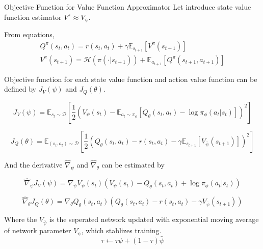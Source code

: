 \documentclass[8pt]{beamer}
\begin{document}
\begin{frame}{Objective Function for Value Function Approximator}
    Let introduce state value function estimator $V^\pi \approx V_\psi$.

    From equations,
    \[
    \begin{gathered}
        Q^\pi (s_t, a_t) = r(s_t, a_t) + \gamma \mathbb{E}_{s_{t+1}}[V^\pi (s_{t+1})] \\
        V^\pi(s_{t+1}) = \mathcal{H}(\pi(\cdot | s_{t+1})) + \mathbb{E}_{a_{t+1}}[Q^\pi(s_{t+1}, a_{t+1})]
    \end{gathered}
    \]

    Objective function for each state value function and action value function can be defined by $J_V (\psi)$ and $J_Q (\theta)$.

    \begin{equation*}
        J_V(\psi) = \mathbb{E}_{s_t \sim \mathcal{D}} \left[ \frac{1}{2} \left(V_\psi (s_t) - \mathbb{E}_{a_t \sim \pi_\phi}[Q_\theta(s_t, a_t) - \log{\pi_\phi (a_t | s_t)}]\right)^2 \right] 
    \end{equation*}

    \begin{equation*}
        J_Q(\theta) = \mathbb{E}_{(s_t,a_t) \sim \mathcal{D}} \left[ \frac{1}{2} \left(Q_\theta (s_t, a_t) - r(s_t,a_t) - \gamma \mathbb{E}_{s_{t+1}}[V_{\bar{\psi}}(s_{t+1})] \right)^2\right]
    \end{equation*}

    And the derivative $\hat{\nabla}_\psi$ and $\hat{\nabla}_\theta$ can be estimated by

    \begin{equation*}
        \hat{\nabla}_\psi J_V (\psi) = \nabla_\psi V_\psi (s_t) (V_\psi (s_t) - Q_\theta (s_t, a_t) + \log{\pi_\phi}(a_t|s_t))
    \end{equation*}

    \begin{equation*}
        \hat{\nabla}_\theta J_Q (\theta) = \nabla_\theta Q_\theta (s_t, a_t)(Q_\theta (s_t, a_t) - r(s_t, a_t) - \gamma V_{\bar{\psi}}(s_{t+1}))
    \end{equation*}

    Where the $V_{\bar{\psi}}$ is the seperated network updated with exponential moving average of network parameter $V_\psi$, which stablizes training.
    \[
       \tau \leftarrow \tau \psi + (1- \tau)\bar{\psi}
    \]
\end{frame}
\end{document}
